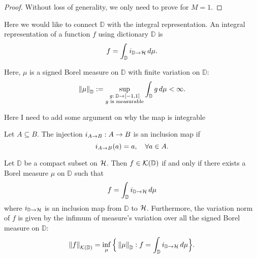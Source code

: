 \begin{proof}
    Without loss of generality, we only need to prove for $M = 1$.
\end{proof}


Here we would like to connect $\mathbb{D}$ with the integral representation. An integral representation of a function $f$ using dictionary $\mathbb{D}$ is
\begin{equation}
    f = \int_{\mathbb{D}} i_{{\mathbb{D}}\to{\mathcal{H}}} \,d\mu.
\end{equation}

Here, $\mu$ is a signed Borel measure on $\mathbb{D}$ with finite variation on $\mathbb{D}$:
\begin{equation}
    \label{eq:measure_set_variation}
    \left\| \mu \right\|_{\mathbb{D}} := \sup_{\substack{
            g: \:\mathbb{D} \to [-1, 1] \\ g \textnormal{ is measurable}
        }
    } \int_{\mathbb{D}} g\,d\mu < \infty.
\end{equation}


Here I need to add some argument on why the map is integrable

\begin{definition}
    \label{def:inclusionMap}
    Let $A \subseteq B$. The injection $i_{{A}\to{B}}: A\to B$ is an
    inclusion map if
    \begin{equation}
        i_{{A}\to{B}}(a) = a, \quad \forall a \in A.
    \end{equation}
\end{definition}

\begin{lemma}
    \label{lemma:compact_set_integral_representation}
    Let $\mathbb{D}$ be a compact subset on $\mathcal{H}$. Then $f \in
    \mathcal{K}({\mathbb{D}})$ if and only if there exists a Borel measure $\mu$ on
    $\mathbb{D}$ such that
    \begin{equation}
        f = \int_{\mathbb{D}} i_{{\mathbb{D}}\to{\mathcal{H}}} \,d\mu
    \end{equation}
    where $i_{{\mathbb{D}}\to{\mathcal{H}}}$ is an inclusion map from
    $\mathbb{D}$ to $\mathcal{H}$. Furthermore, the variation norm of $f$ is given
    by the infimum of measure's variation over all the signed Borel measure on
    $\mathbb{D}$:
    \begin{equation}
        \left\| {f} \right\|_{\mathcal{K}({\mathbb{D}})} = \inf_{\mu}\Big\{
            \left\| \mu \right\|_{\mathbb{D}}: 
            f = \int_{\mathbb{D}} i_{{\mathbb{D}}\to{\mathcal{H}}} \,d\mu
        \Big\}.
    \end{equation}
\end{lemma}

